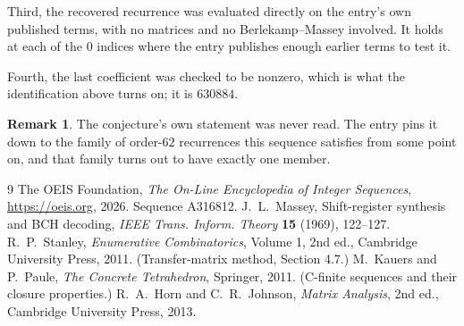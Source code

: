 \documentclass[11pt,a4paper]{article}
\theoremstyle{plain}
\theoremstyle{definition}
\newtheorem{remark}[theorem]{Remark}
\begin{document}
Third, the recovered recurrence was evaluated directly on the entry's own published terms, with
no matrices and no Berlekamp--Massey involved. It holds at each of the $0$ indices where
the entry publishes enough earlier terms to test it.

Fourth, the last coefficient was checked to be nonzero, which is what the identification above
turns on; it is $630884$.

\begin{remark}
The conjecture's own statement was never read. The entry pins it down to the family of
order-$62$ recurrences this sequence satisfies from some point on, and that family turns
out to have exactly one member.
\end{remark}

\begin{thebibliography}{9}
 The OEIS Foundation, \emph{The On-Line Encyclopedia of Integer
Sequences}, \url{https://oeis.org}, 2026. Sequence A316812.
 J.~L.~Massey, Shift-register synthesis and BCH decoding, \emph{IEEE
Trans. Inform. Theory} \textbf{15} (1969), 122--127.
 R.~P.~Stanley, \emph{Enumerative Combinatorics}, Volume 1, 2nd ed.,
Cambridge University Press, 2011. (Transfer-matrix method, Section 4.7.)
 M.~Kauers and P.~Paule, \emph{The Concrete Tetrahedron}, Springer, 2011.
(C-finite sequences and their closure properties.)
 R.~A.~Horn and C.~R.~Johnson, \emph{Matrix Analysis}, 2nd ed., Cambridge
University Press, 2013.
\end{thebibliography}
\end{document}
